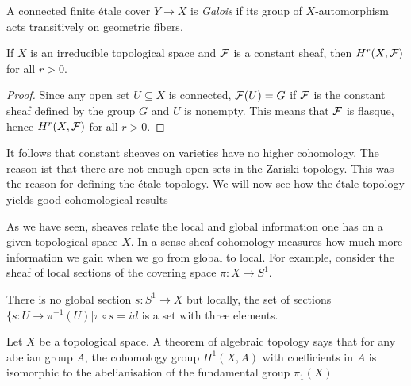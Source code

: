 \begin{definition}
  A connected finite \'etale cover $Y \to X$ is \textit{Galois} if its group of $X$-automorphism acts transitively on geometric fibers.
\end{definition}

\begin{theorem}
  If $X$ is an irreducible topological space and $\mathcal{F}$ is a constant sheaf, then $H^r(X, \mathcal{F})$ for all $r>0$.
\end{theorem}
\begin{proof}
  Since any open set $U \subseteq X$ is connected, $\mathcal{F}(U) = G$ if $\mathcal{F}$ is the constant sheaf defined by the group $G$ and $U$ is nonempty. This means that $\mathcal{F}$ is flasque, hence $H^r(X, \mathcal{F})$ for all $r>0$.
\end{proof}
It follows that constant sheaves on varieties have no higher cohomology. The reason ist that there are not enough open sets in the Zariski topology. This was the reason for defining the \'etale topology. We will now see how the \'etale topology yields good cohomological results

As we have seen, sheaves relate the local and global information one has on a given topological space $X$. In a sense sheaf cohomology measures how much more information we gain when we go from global to local. For example, consider the sheaf of local sections of the covering space $\pi : X \to S^1$.


There is no global section $s: S^1 \to X$ but locally, the set of sections $\{s: U \to \pi^{-1}(U) | \pi \circ s = id$ is a set with three elements.

Let $X$ be a topological space. A theorem of algebraic topology says that for any abelian group $A$, the cohomology group $H^1(X,A)$ with coefficients in $A$ is isomorphic to the abelianisation of the fundamental group $\pi_1(X)$